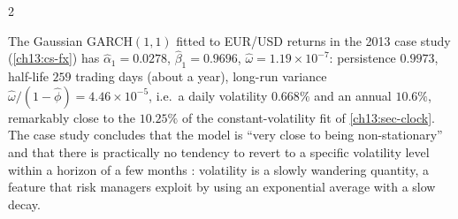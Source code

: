 \begin{paracol}{2}
\begin{finance}\label{ch13:fin-persist}
The Gaussian GARCH$(1,1)$ fitted to EUR/USD returns in the 2013 case study (\cref{ch13:cs-fx}) has $\hat\alpha_1=0.0278$, $\hat\beta_1=0.9696$, $\hat\omega=1.19\times10^{-7}$: persistence $0.9973$,
half-life $259$ trading days (about a year), long-run variance $\hat\omega/(1-\hat\phi)=4.46\times10^{-5}$, i.e.\ a daily volatility $0.668\%$ and an annual $10.6\%$, remarkably close to the $10.25\%$ of the constant-volatility fit
of \cref{ch13:sec-clock}. The case study concludes that the model is ``very close to being non-stationary'' and that there is practically no tendency to revert to a specific volatility level within a horizon of
a few months : volatility is a slowly wandering quantity, a feature that risk managers exploit by using an exponential average with a slow decay.
\end{finance}


\end{paracol}
